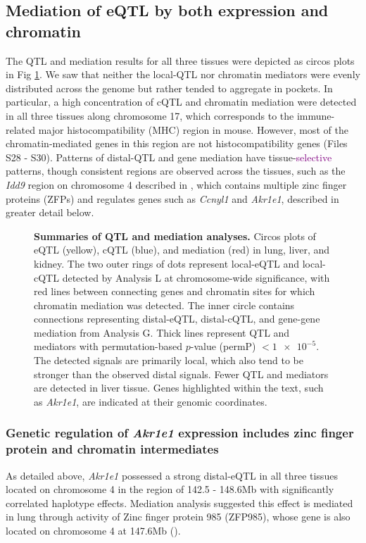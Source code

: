 \documentclass[10pt,letterpaper]{article}
\newcommand{\TFinline}[1]{\textcolor{purple}{#1}}
\begin{document}
\subsection*{Mediation of eQTL by both expression and chromatin}
The QTL and mediation results for all three tissues were depicted as circos plots \cite{Gu2014} in Fig \ref{fig:circos_plot}. We saw that neither the local-QTL nor chromatin mediators were evenly distributed across the genome but rather tended to aggregate in pockets. In particular, a high concentration of cQTL and chromatin mediation were detected in all three tissues along chromosome 17, which corresponds to the immune-related major histocompatibility (MHC) region in mouse. However, most of the chromatin-mediated genes in this region are not histocompatibility genes (Files S28 - S30). Patterns of distal-QTL and gene mediation have tissue-\TFinline{selective} patterns, though consistent regions are observed across the tissues, such as the \textit{Idd9} region on chromosome 4 described in \cite{HamiltonWilliams2010}, which contains multiple zinc finger proteins (ZFPs) and regulates genes such as \textit{Ccnyl1} and \textit{Akr1e1}, described in greater detail below.

\begin{figure}[h!]
\caption{\textbf{Summaries of QTL and mediation analyses.} Circos plots of eQTL (yellow), cQTL (blue), and mediation (red) in lung, liver, and kidney. The two outer rings of dots represent local-eQTL and local-cQTL detected by Analysis L at chromosome-wide significance, with red lines between connecting genes and chromatin sites for which chromatin mediation was detected. The inner circle contains connections representing distal-eQTL, distal-cQTL, and gene-gene mediation from Analysis G. Thick lines represent QTL and mediators with permutation-based $p$-value (permP) $< \num{1e-5}$. The detected signals are primarily local, which also tend to be stronger than the observed distal signals. Fewer QTL and mediators are detected in liver tissue. 
Genes highlighted within the text, such as \textit{Akr1e1}, are indicated at their genomic coordinates.
\label{fig:circos_plot}}
\end{figure}

\subsubsection*{Genetic regulation of \textit{Akr1e1} expression includes zinc finger protein and chromatin intermediates}
As detailed above, \textit{Akr1e1} possessed a strong distal-eQTL in all three tissues located on chromosome 4 in the region of 142.5 - 148.6Mb with significantly correlated haplotype effects. Mediation analysis suggested this effect is mediated in lung through activity of Zinc finger protein 985 (ZFP985), whose gene is also located on chromosome 4 at 147.6Mb (). 
\end{document}
